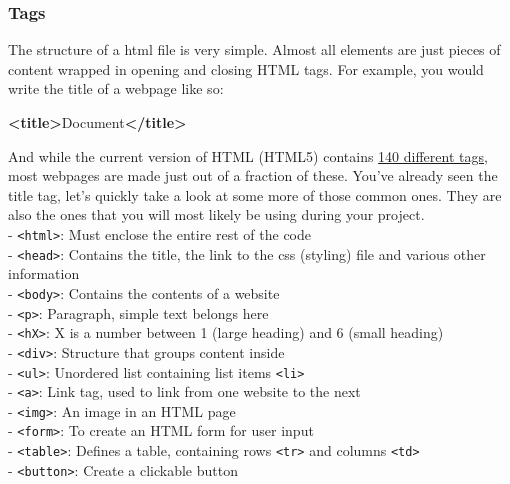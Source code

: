 \documentclass[
]{article}
\newenvironment{Shaded}{\begin{snugshade}}{\end{snugshade}}
\newcommand{\KeywordTok}[1]{\textcolor[rgb]{0.13,0.29,0.53}{\textbf{#1}}}
\newcommand{\NormalTok}[1]{#1}
\begin{document}
\hypertarget{tags}{%
\subsubsection*{Tags}\label{tags}}

The structure of a html file is very simple. Almost all elements are just pieces of content wrapped in opening and closing HTML tags. For example, you would write the title of a webpage like so:

\begin{Shaded}
\begin{Highlighting}[]
\KeywordTok{\textless{}title\textgreater{}}\NormalTok{Document}\KeywordTok{\textless{}/title\textgreater{}}  
\end{Highlighting}
\end{Shaded}

And while the current version of HTML (HTML5) contains \href{https://www.w3schools.com/TAGS/default.ASP}{140 different tags}, most webpages are made just out of a fraction of these. You've already seen the title tag, let's quickly take a look at some more of those common ones. They are also the ones that you will most likely be using during your project.\\
- \texttt{\textless{}html\textgreater{}}: Must enclose the entire rest of the code\\
- \texttt{\textless{}head\textgreater{}}: Contains the title, the link to the css (styling) file and various other information\\
- \texttt{\textless{}body\textgreater{}}: Contains the contents of a website\\
- \texttt{\textless{}p\textgreater{}}: Paragraph, simple text belongs here\\
- \texttt{\textless{}hX\textgreater{}}: X is a number between 1 (large heading) and 6 (small heading)\\
- \texttt{\textless{}div\textgreater{}}: Structure that groups content inside\\
- \texttt{\textless{}ul\textgreater{}}: Unordered list containing list items \texttt{\textless{}li\textgreater{}}\\
- \texttt{\textless{}a\textgreater{}}: Link tag, used to link from one website to the next\\
- \texttt{\textless{}img\textgreater{}}: An image in an HTML page\\
- \texttt{\textless{}form\textgreater{}}: To create an HTML form for user input\\
- \texttt{\textless{}table\textgreater{}}: Defines a table, containing rows \texttt{\textless{}tr\textgreater{}} and columns \texttt{\textless{}td\textgreater{}}\\
- \texttt{\textless{}button\textgreater{}}: Create a clickable button
\end{document}
